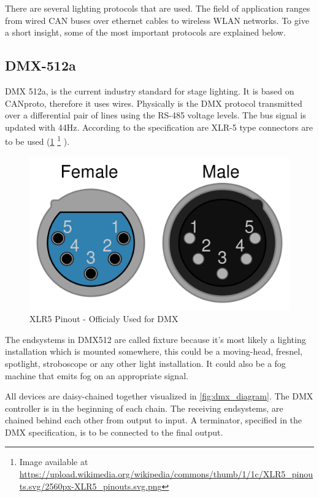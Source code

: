 There are several lighting protocols that are used. The field of application ranges from wired CAN buses over ethernet cables to wireless WLAN networks.
To give a short insight, some of the most important protocols are explained below.

\subsection*{DMX-512a}
\ac{DMX} 512a, is the current industry standard for stage lighting. It is based on \ac{CANproto}, therefore it uses wires.
Physically is the DMX protocol transmitted over a differential pair of lines using the RS-485 voltage levels. 
The bus signal is updated with 44Hz.
According to the specification are XLR-5 type connectors are to be used (\cref{fig:xlr}
\footnote{Image available at \url{https://upload.wikimedia.org/wikipedia/commons/thumb/1/1c/XLR5_pinouts.svg/2560px-XLR5_pinouts.svg.png}}
).

\begin{figure}[h]
	\centering
	\includegraphics[trim={0 0 0 0.0cm}, clip, scale=0.05]{figures/XLR_stecker.png}
	\caption{XLR5 Pinout - Officialy Used for DMX}
	\label{fig:xlr}
\end{figure}

The endsystems in DMX512 are called fixture because it's most likely a lighting installation which is mounted somewhere, 
this could be a moving-head, fresnel, spotlight, stroboscope or any other light installation.
It could also be a fog machine that emits fog on an appropriate signal.

All devices are daisy-chained together visualized in \ref{fig:dmx_diagram}.
The DMX controller is in the beginning of each chain.
The receiving endsystems, are chained behind each other from output to input. 
A terminator, specified in the DMX specification, is to be connected to the final output.
 


